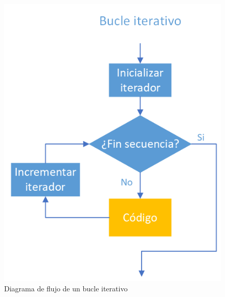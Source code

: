 \documentclass[
  a4paper,
]{scrreport}
\theoremstyle{definition}
\theoremstyle{definition}
\theoremstyle{remark}
\begin{document}
\begin{figure}

{\centering \includegraphics{img/04-estructuras-control/bucle-for.png}

}

\caption{Diagrama de flujo de un bucle iterativo}

\end{figure}
\end{document}
